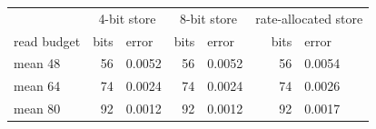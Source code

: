 \begin{tabular}{lrlrlrl}
\toprule
 & \multicolumn{2}{c}{4-bit store} & \multicolumn{2}{c}{8-bit store} & \multicolumn{2}{c}{rate-allocated store} \\
read budget & bits & error & bits & error & bits & error \\
\midrule
mean 48 & 56 & 0.0052 & 56 & 0.0052 & 56 & 0.0054 \\
mean 64 & 74 & 0.0024 & 74 & 0.0024 & 74 & 0.0026 \\
mean 80 & 92 & 0.0012 & 92 & 0.0012 & 92 & 0.0017 \\
\bottomrule
\end{tabular}